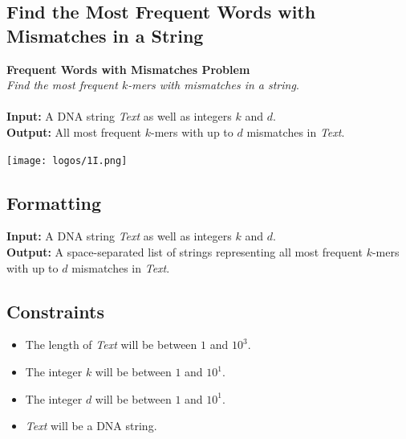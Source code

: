 \documentclass{article}
\begin{document}
\subsection{Find the Most Frequent Words with Mismatches in a String}
\hline\vspace{5}
\noindent \textbf{Frequent Words with Mismatches Problem}\\
\emph{Find the most frequent $k$-mers with mismatches in a string}.\\ \\
\textbf{Input:} A DNA string \emph{Text} as well as integers $k$ and $d$.\\
\textbf{Output:} All most frequent $k$-mers with up to $d$ mismatches in \emph{Text}.
\begin{center}
    \texttt{[image: logos/1I.png]} 
\end{center}
\hline\vspace{5}

\subsection*{Formatting}
\textbf{Input:} A DNA string \emph{Text} as well as integers $k$ and $d$.\\
\noindent \textbf{Output:} A space-separated list of strings representing all most frequent $k$-mers with up to $d$ mismatches in \emph{Text}.

\subsection*{Constraints}
\begin{itemize}
    \item The length of \emph{Text} will be between $1$ and $10^3$.
    \item The integer $k$ will be between $1$ and $10^1$.
    \item The integer $d$ will be between $1$ and $10^1$.
    \item \emph{Text} will be a DNA string.
\end{itemize}
\pagebreak
\end{document}
